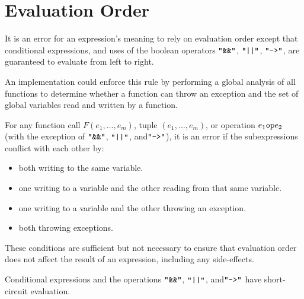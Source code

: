 \section{Evaluation Order}
It is an error for an expression’s meaning to rely on evaluation order except that conditional expressions, and uses
of the boolean operators $\texttt{"}\texttt{\&\&}\texttt{"}$, $\texttt{"}\texttt{||}\texttt{"}$, $\texttt{"}\texttt{-->}\texttt{"}$, are guaranteed to evaluate from left to right.

An implementation could enforce this rule by performing a global analysis of all functions to determine whether a
function can throw an exception and the set of global variables read and written by a function.

For any function call $F(e_1,\ldots,e_m)$, tuple $(e_1,\ldots, e_m)$, or operation $e_1 \texttt{op} e_2$
(with the exception of $\texttt{"}\texttt{\&\&}\texttt{"}$, $\texttt{"}\texttt{||}\texttt{"}$, and$\texttt{"}\texttt{-->}\texttt{"}$),
it is an error if the subexpressions conflict with each other by:
\begin{itemize}
  \item both writing to the same variable.
  \item one writing to a variable and the other reading from that same variable.
  \item one writing to a variable and the other throwing an exception.
  \item both throwing exceptions.
\end{itemize}

These conditions are sufficient but not necessary to ensure that evaluation order does not affect the result of an
expression, including any side-effects.

Conditional expressions and the operations $\texttt{"}\texttt{\&\&}\texttt{"}$, $\texttt{"}\texttt{||}\texttt{"}$, and$\texttt{"}\texttt{-->}\texttt{"}$ have short-circuit evaluation.

